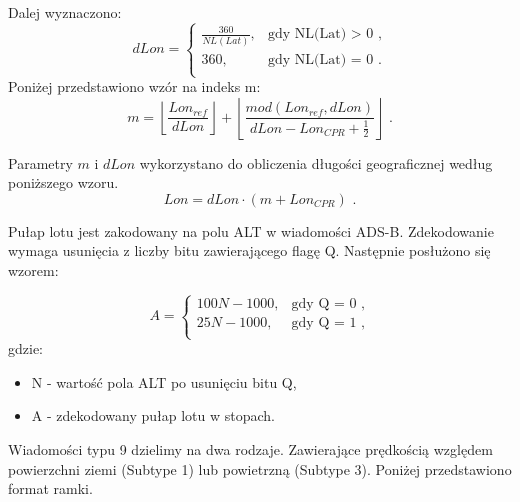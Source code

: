 \documentclass[eng,printmode]{mgr}
\newcommand{\floor}[1]{\left\lfloor #1 \right\rfloor}
\begin{document}
\noindent
Dalej wyznaczono:
\begin{equation}
\renewcommand*{\arraystretch}{1.3}
dLon= \left\{ \begin{array}{ll}
\frac{360}{NL(Lat)}, & \textrm{gdy NL(Lat) > 0 ,}\\
360 , & \textrm{gdy NL(Lat) = 0 .}\\
\end{array} \right.
\end{equation}
\noindent
Poniżej przedstawiono wzór na indeks m:
\begin{equation}
m = \floor{\frac{Lon_{ref}}{dLon}} + \floor{\frac{mod(Lon_{ref},dLon)}{dLon - Lon_{CPR} + \frac{1}{2}}} \textrm{ .}
\end{equation}

Parametry $m$ i $dLon$ wykorzystano do obliczenia długości geograficznej według poniższego wzoru.
\begin{equation}
Lon = dLon \cdot \left(m + Lon_{CPR}\right) \textrm{ .}
\end{equation}

Pułap lotu jest zakodowany na polu ALT w wiadomości ADS-B. Zdekodowanie wymaga usunięcia z liczby  bitu zawierającego flagę Q. Następnie posłużono się wzorem:

\begin{equation}
\renewcommand*{\arraystretch}{1.3}
A= \left\{ \begin{array}{ll}

100N - 1000, & \textrm{gdy Q = 0 ,}\\
25N - 1000, & \textrm{gdy Q = 1 ,}\\

\end{array} \right.
\end{equation}
\noindent
gdzie: 
\begin{itemize}
\item N - wartość pola ALT po usunięciu bitu Q,
\item A - zdekodowany pułap lotu w stopach.
\end{itemize}

Wiadomości typu 9 dzielimy na dwa rodzaje. Zawierające prędkością względem powierzchni ziemi (Subtype 1) lub powietrzną (Subtype 3). Poniżej przedstawiono format ramki.
\end{document}
